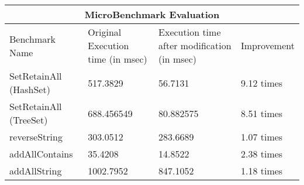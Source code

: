 \begin{tabular}{ |p{3cm}|p{4cm}|p{4cm}|p{3cm}|  }
\hline
\multicolumn{4}{|c|}{MicroBenchmark Evaluation} \\
\hline
Benchmark Name & Original Execution time (in msec) & Execution time after modification (in msec) & Improvement \\
\hline
SetRetainAll (HashSet) &517.3829 & 56.7131 & 9.12 times \\
SetRetainAll (TreeSet) &688.456549 & 80.882575 & 8.51 times \\
reverseString &303.0512 & 283.6689 & 1.07 times \\
addAllContains &35.4208 & 14.8522 & 2.38 times \\
addAllString    &1002.7952 & 847.1052 & 1.18 times \\
\hline
\end{tabular}